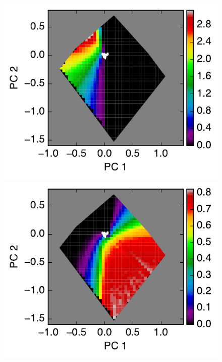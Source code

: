 \documentclass[iop,numberedappendix,apj]{emulateapj}
\begin{document}
\begin{figure}[tbh!]
   \begin{minipage}{0.33\hsize}
    \begin{center}
	\includegraphics[width=\hsize]{raddata_2_norm_noreg_0.pdf}
    \end{center}	
   \end{minipage}
   \begin{minipage}{0.33\hsize}
    \begin{center}
	\includegraphics[width=\hsize]{raddata_2_norm_noreg_1.pdf}

\end{center}
\end{minipage}
\end{figure}
\end{document}
